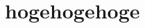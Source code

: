 \documentclass[11pt, dvipdfmx]{jreport}
\begin{document}
\chapter{hogehogehoge}
\label{chap:hogehogehoge}
\end{document}
